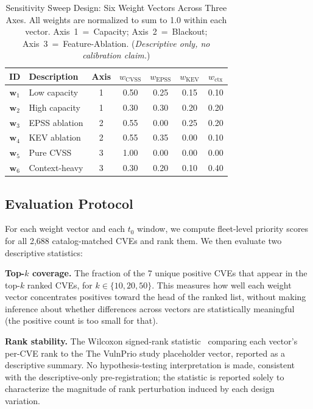\documentclass[conference]{IEEEtran}
\begin{document}
\begin{table}[t]
\caption{Sensitivity Sweep Design: Six Weight Vectors Across Three Axes.
All weights are normalized to sum to 1.0 within each vector.
Axis~1~=~Capacity; Axis~2~=~Blackout; Axis~3~=~Feature-Ablation.
(\textit{Descriptive only, no calibration claim.})}
\label{tab:sensitivity-design}
\centering
\setlength{\tabcolsep}{4pt}
\begin{tabular}{@{}clccccc@{}}
\toprule
\textbf{ID} & \textbf{Description} & \textbf{Axis}
 & $w_{\text{CVSS}}$ & $w_{\text{EPSS}}$ & $w_{\text{KEV}}$
 & $w_{\text{ctx}}$ \\
\midrule
$\mathbf{w}_1$ & Low capacity & 1 & 0.50 & 0.25 & 0.15 & 0.10 \\
$\mathbf{w}_2$ & High capacity & 1 & 0.30 & 0.30 & 0.20 & 0.20 \\
$\mathbf{w}_3$ & EPSS ablation & 2 & 0.55 & 0.00 & 0.25 & 0.20 \\
$\mathbf{w}_4$ & KEV ablation & 2 & 0.55 & 0.35 & 0.00 & 0.10 \\
$\mathbf{w}_5$ & Pure CVSS & 3 & 1.00 & 0.00 & 0.00 & 0.00 \\
$\mathbf{w}_6$ & Context-heavy & 3 & 0.30 & 0.20 & 0.10 & 0.40 \\
\bottomrule
\end{tabular}
\end{table}

\subsection{Evaluation Protocol}
\label{subsec:eval-protocol}

For each weight vector and each $t_0$ window, we compute fleet-level priority
scores for all 2,688 catalog-matched CVEs and rank them. We then evaluate
two descriptive statistics:

\textbf{Top-$k$ coverage.} The fraction of the 7 unique positive CVEs
that appear in the top-$k$ ranked CVEs, for $k \in \{10, 20, 50\}$.
This measures how well each weight vector concentrates positives toward the
head of the ranked list, without making inference about whether differences
across vectors are statistically meaningful (the positive count is too small
for that).

\textbf{Rank stability.} The Wilcoxon signed-rank
statistic~\cite{wilcoxon1945} comparing each vector's per-CVE rank to the
The VulnPrio study placeholder vector, reported as a descriptive summary. No
hypothesis-testing interpretation is made, consistent with the descriptive-only
pre-registration; the statistic is reported solely to characterize
the magnitude of rank perturbation induced by each design variation.
\end{document}
